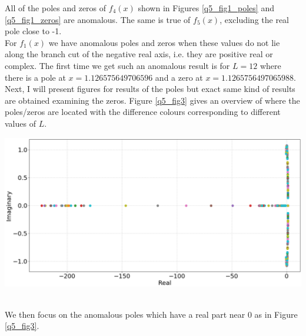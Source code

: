 \documentclass[12pt, a4paper]{article}
\begin{document}
All of the poles and zeros of $f_{4}(x)$ shown in Figures \ref{q5_fig1_poles} and \ref{q5_fig1_zeros}
are anomalous. The same is true of $f_{5}(x)$, excluding the real pole close to -1.
\\

For $f_{1}(x)$ we have anomalous poles and zeros when these values do not lie along the branch cut
of the negative real axis, i.e. they are positive real or complex. The first time we get such an
anomalous result is for $L = 12$ where there is a pole at $x = 1.126575649706596$ and a zero at 
$x = 1.1265756497065988$. Next, I will present figures for results of the poles but exact same kind 
of results are obtained examining the zeros. Figure \ref{q5_fig3} gives an overview of where the
poles/zeros are located with the difference colours corresponding to different values of $L$.

\vspace{0.3cm}
\begin{minipage}{\textwidth}
	\centering
	\includegraphics[width=\linewidth]{q5_fig3}
	\label{q5_fig3}
\end{minipage}
\\

We then focus on the anomalous poles which have a real part near 0 as in Figure \ref{q5_fig3}.
\end{document}
